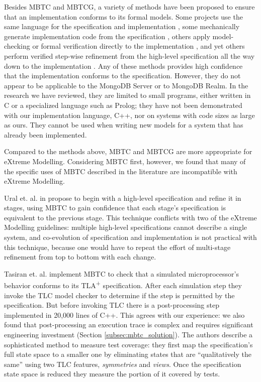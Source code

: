 \documentclass{vldb}
\begin{document}
Besides MBTC and MBTCG, a variety of methods have been proposed to ensure that an implementation conforms to its formal models.
Some projects use the same language for the specification and implementation \cite{KerGre99}, some mechanically generate implementation code from the specification \cite{Houhou17CodeGenerationFromSpecification}, others apply model-checking or formal verification directly to the implementation \cite{Chudnov18ContinuousFormalVerification, Holzmann04ModelDrivenVerification}, and yet others perform verified step-wise refinement from the high-level specification all the way down to the implementation \cite{Eiriksson95UsingFormalVerification}.
Any of these methods provides high confidence that the implementation conforms to the specification. 
However, they do not appear to be applicable to the MongoDB Server or to MongoDB Realm.
In the research we have reviewed, they are limited to small programs, either written in C or a specialized language such as Prolog; they have not been demonstrated with our implementation language, C++, nor on systems with code sizes as large as ours.
They cannot be used when writing new models for a system that has already been implemented.

Compared to the methods above, MBTC and MBTCG are more appropriate for eXtreme Modelling.
Considering MBTC first, however, we found that many of the specific uses of MBTC described in the literature are incompatible with eXtreme Modelling.


Ural et. al. in \cite{Ural84AutomatedTestingOfProtocolSpecifications} propose to begin with a high-level specification and refine it in stages, using MBTC to gain confidence that each stage's specification is equivalent to the previous stage.
This technique conflicts with two of the eXtreme Modelling guidelines: multiple high-level specifications cannot describe a single system, and co-evolution of specification and implementation is not practical with this technique, because one would have to repeat the effort of multi-stage refinement from top to bottom with each change.

Tasiran et. al. \cite{Tasiran03AlphaMicroprocessor} implement MBTC to check that a simulated microprocessor's behavior conforms to its TLA\textsuperscript{+} specification.
After each simulation step they invoke the TLC model checker to determine if the step is permitted by the specification.
But before invoking TLC there is a post-processing step implemented in 20,000 lines of C++.
This agrees with our experience: we also found that post-processing an execution trace is complex and requires significant engineering investment (Section \ref{subsec:mbtc_solution}).
The authors describe a sophisticated method to measure test coverage: they first map the specification's full state space to a smaller one by eliminating states that are ``qualitatively the same'' using two TLC features, \textit{symmetries} and \textit{views}. Once the specification state space is reduced they measure the portion of it covered by tests.
\end{document}
